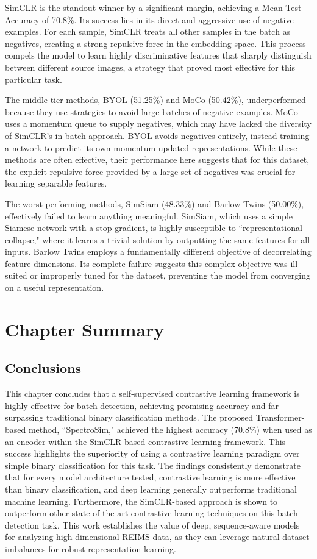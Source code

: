 SimCLR is the standout winner by a significant margin, achieving a Mean Test Accuracy of 70.8\%. Its success lies in its direct and aggressive use of negative examples. For each sample, SimCLR treats all other samples in the batch as negatives, creating a strong repulsive force in the embedding space. This process compels the model to learn highly discriminative features that sharply distinguish between different source images, a strategy that proved most effective for this particular task.

The middle-tier methods, BYOL (51.25\%) and MoCo (50.42\%), underperformed because they use strategies to avoid large batches of negative examples. MoCo uses a momentum queue to supply negatives, which may have lacked the diversity of SimCLR's in-batch approach. BYOL avoids negatives entirely, instead training a network to predict its own momentum-updated representations. While these methods are often effective, their performance here suggests that for this dataset, the explicit repulsive force provided by a large set of negatives was crucial for learning separable features.

The worst-performing methods, SimSiam (48.33\%) and Barlow Twins (50.00\%), effectively failed to learn anything meaningful. SimSiam, which uses a simple Siamese network with a stop-gradient, is highly susceptible to ``representational collapse," where it learns a trivial solution by outputting the same features for all inputs. Barlow Twins employs a fundamentally different objective of decorrelating feature dimensions. Its complete failure suggests this complex objective was ill-suited or improperly tuned for the dataset, preventing the model from converging on a useful representation.

\section{Chapter Summary}
\label{sec:conclusions}

\subsection{Conclusions}

This chapter concludes that a self-supervised contrastive learning framework is highly effective for batch detection, achieving promising accuracy and far surpassing traditional binary classification methods. The proposed Transformer-based method, ``SpectroSim," achieved the highest accuracy (70.8\%) when used as an encoder within the SimCLR-based contrastive learning framework.
This success highlights the superiority of using a contrastive learning paradigm over simple binary classification for this task. The findings consistently demonstrate that for every model architecture tested, contrastive learning is more effective than binary classification, and deep learning generally outperforms traditional machine learning. Furthermore, the SimCLR-based approach is shown to outperform other state-of-the-art contrastive learning techniques on this batch detection task. This work establishes the value of deep, sequence-aware models for analyzing high-dimensional REIMS data, as they can leverage natural dataset imbalances for robust representation learning.

